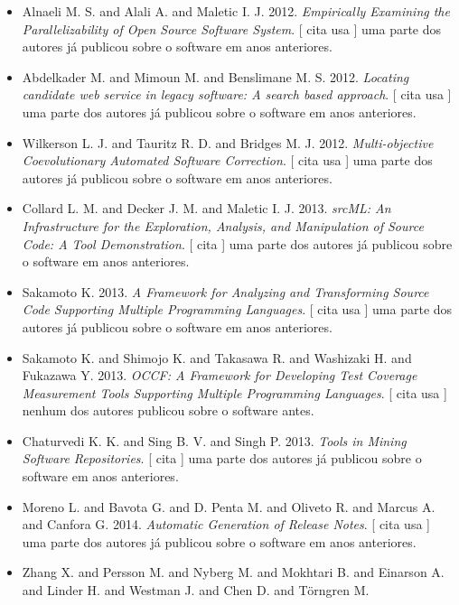 \begin{itemize}
\item Alnaeli M. S. and Alali A. and Maletic I. J.
      2012.
        \textit{ Empirically Examining the Parallelizability of Open Source Software System}.
      [
          cita
          usa
      ]
uma parte dos autores já publicou sobre o software em anos anteriores.
\item Abdelkader M. and Mimoun M. and Benslimane M. S.
      2012.
        \textit{ Locating candidate web service in legacy software: A search based approach}.
      [
          cita
          usa
      ]
uma parte dos autores já publicou sobre o software em anos anteriores.
\item Wilkerson L. J. and Tauritz R. D. and Bridges M. J.
      2012.
        \textit{ Multi-objective Coevolutionary Automated Software Correction}.
      [
          cita
          usa
      ]
uma parte dos autores já publicou sobre o software em anos anteriores.
\item Collard L. M. and Decker J. M. and Maletic I. J.
      2013.
        \textit{ srcML: An Infrastructure for the Exploration, Analysis, and Manipulation of Source Code: A Tool Demonstration}.
      [
          cita
      ]
uma parte dos autores já publicou sobre o software em anos anteriores.
\item Sakamoto K.
      2013.
        \textit{ A Framework for Analyzing and Transforming Source Code Supporting Multiple Programming Languages}.
      [
          cita
          usa
      ]
uma parte dos autores já publicou sobre o software em anos anteriores.
\item Sakamoto K. and Shimojo K. and Takasawa R. and Washizaki H. and Fukazawa Y.
      2013.
        \textit{ OCCF: A Framework for Developing Test Coverage Measurement Tools Supporting Multiple Programming Languages}.
      [
          cita
          usa
      ]
nenhum dos autores publicou sobre o software antes.
\item Chaturvedi K. K. and Sing B. V. and Singh P.
      2013.
        \textit{ Tools in Mining Software Repositories}.
      [
          cita
      ]
uma parte dos autores já publicou sobre o software em anos anteriores.
\item Moreno L. and Bavota G. and D. Penta M. and Oliveto R. and Marcus A. and Canfora G.
      2014.
        \textit{ Automatic Generation of Release Notes}.
      [
          cita
          usa
      ]
uma parte dos autores já publicou sobre o software em anos anteriores.
\item Zhang X. and Persson M. and Nyberg M. and Mokhtari B. and Einarson A. and Linder H. and Westman J. and Chen D. and Törngren M.

\end{itemize}
